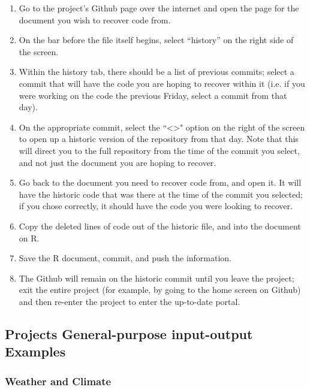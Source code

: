 \documentclass{article}\usepackage[]{graphicx}\usepackage[]{color}
\begin{document}
\begin{enumerate}

\item Go to the project's Github page over the internet and open the page for the document you wish to recover code from.

\item On the bar before the file itself begins, select ``history'' on the right side of the screen.

\item Within the history tab, there should be a list of previous commits; select a commit that will have the code you are hoping to recover within it (i.e. if you were working on the code the previous Friday, select a commit from that day).

\item On the appropriate commit, select the ``<>" option on the right of the screen to open up a historic version of the repository from that day.  Note that this will direct you to the full repository from the time of the commit you select, and not just the document you are hoping to recover.

\item Go back to the document you need to recover code from, and open it.  It will have the historic code that was there at the time of the commit you selected; if you chose correctly, it should have the code you were looking to recover.

\item Copy the deleted lines of code out of the historic file, and into the document on R. 

\item Save the R document, commit, and push the information.  

\item The Github will remain on the historic commit until you leave the project; exit the entire project (for example, by going to the home screen on Github) and then re-enter the project to enter the up-to-date portal.

\end{enumerate}

\subsection{Projects General-purpose input-output Examples}

\subsubsection{Weather and Climate}
\end{document}
